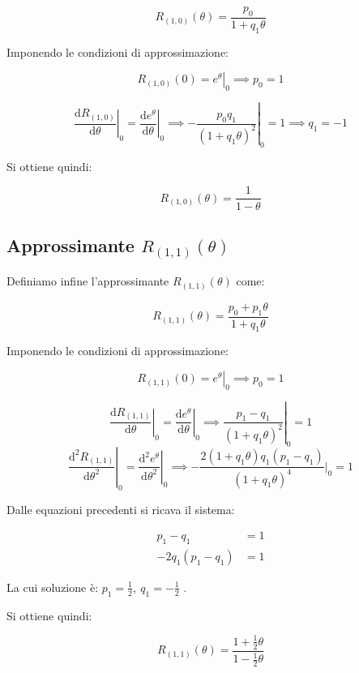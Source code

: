 \[R_{(1,0)}(\theta) = \frac{p_0}{1 + q_1 \theta}  \]

Imponendo le condizioni di approssimazione:

\[R_{(1,0)}(0) = \left. e^{\theta} \right|_0 \implies p_0 = 1  \]

\[\left. \frac{\mathrm{d} R_{(1,0)}}{\mathrm{d} \theta} \right|_0 = \left. 
\frac{\mathrm{d} e^{\theta}}{\mathrm{d} \theta} \right|_0 \implies -\left. \frac{p_0 q_1}{(1 + q_1 \theta)^2} \right|_0 = 1 \implies q_1 = -1  \]

Si ottiene quindi:

\[R_{(1,0)}(\theta) = \frac{1}{1 - \theta} \] 

%
\subsection{Approssimante $R_{(1,1)}(\theta)$}

Definiamo infine l’approssimante  $R_{(1,1)}(\theta)$  come:

$$R_{(1,1)}(\theta) = \frac{p_0 + p_1 \theta}{1 + q_1 \theta}$$  

Imponendo le condizioni di approssimazione:

$$R_{(1,1)}(0) = \left. e^\theta \right|_0 \implies p_0 = 1$$ 

\[\left. \frac{\mathrm{d} R_{(1,1)}}{\mathrm{d} \theta} \right|_0 = \left. \frac{\mathrm{d} e^\theta}{\mathrm{d} \theta} \right|_0 \implies \left. \frac{p_1 - q_1}{(1 + q_1 \theta)^2} \right|_0 = 1  \]
\[\left. \frac{\mathrm{d}^2 R_{(1,1)}}{\mathrm{d} \theta^2} \right|_0 = \left. \frac{\mathrm{d}^2 e^\theta}{\mathrm{d} \theta^2} \right|_0 \implies -\frac{2(1 + q_1 \theta) q_1 (p_1 - q_1)}{(1 + q_1 \theta)^4} \Bigg|_0 = 1  \]

Dalle equazioni precedenti si ricava il sistema:

\[\begin{aligned}
	p_1 - q_1 &= 1\\
	-2 q_1 (p_1 - q_1) &= 1
\end{aligned}\]  

La cui soluzione è: $p_1 = \frac{1}{2},\ q_1 = -\frac{1}{2}$ .

Si ottiene quindi:

\[R_{(1,1)}(\theta) = \frac{1 + \frac{1}{2} \theta}{1 - \frac{1}{2} \theta} \]
